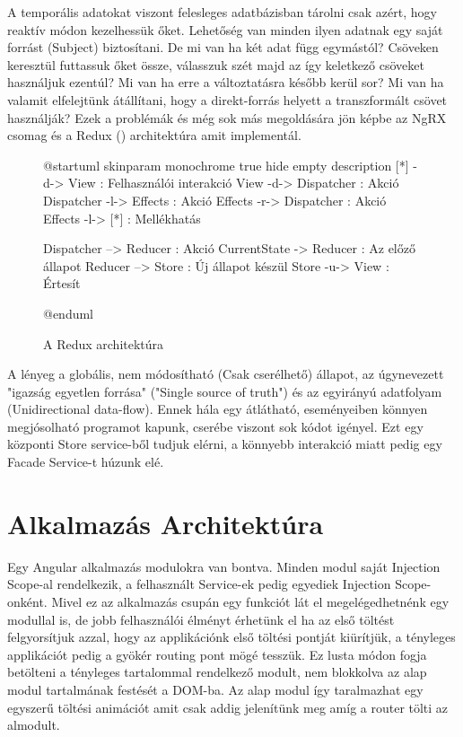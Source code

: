 A temporális adatokat viszont felesleges adatbázisban tárolni csak azért, hogy reaktív módon kezelhessük őket. Lehetőség van minden ilyen adatnak egy saját forrást (Subject) biztosítani. De mi van ha két adat függ egymástól? Csöveken keresztül futtassuk őket össze, válasszuk szét majd az így keletkező csöveket használjuk ezentúl? Mi van ha erre a változtatásra később kerül sor? Mi van ha valamit elfelejtünk átállítani, hogy a direkt-forrás helyett a transzformált csövet használják? Ezek a problémák és még sok más megoldására jön képbe az NgRX \cite{NgRx} csomag és a Redux (\cite{Redux}) architektúra amit implementál.

\begin{figure}[h!]
	\centering
	\begin{plantuml}
		@startuml
		skinparam monochrome true
		hide empty description
		[*] -d-> View : Felhasználói interakció
		View -d-> Dispatcher : Akció
		Dispatcher -l-> Effects : Akció
		Effects -r-> Dispatcher : Akció
		Effects -l-> [*] : Mellékhatás

		Dispatcher --> Reducer : Akció
		CurrentState -> Reducer : Az előző állapot
		Reducer --> Store : Új állapot készül
		Store -u-> View : Értesít

		@enduml
	\end{plantuml}
	\caption{A Redux architektúra}
	\label{fig:redux-architecture}
\end{figure}

A lényeg a globális, nem módosítható (Csak cserélhető) állapot, az úgynevezett "igazság egyetlen forrása" ("Single source of truth") és az egyirányú adatfolyam (Unidirectional data-flow). Ennek hála egy átlátható, eseményeiben könnyen megjósolható programot kapunk, cserébe viszont sok kódot igényel.
Ezt egy központi Store service-ből tudjuk elérni, a könnyebb interakció miatt pedig egy Facade\cite{Facade} Service-t húzunk elé.

\section{Alkalmazás Architektúra}

Egy Angular alkalmazás modulokra van bontva. Minden modul saját Injection Scope-al rendelkezik, a felhasznált Service-ek pedig egyediek Injection Scope-onként. Mivel ez az alkalmazás csupán egy funkciót lát el megelégedhetnénk egy modullal is, de jobb felhasználói élményt érhetünk el ha az első töltést felgyorsítjuk azzal, hogy az applikációnk első töltési pontját kiürítjük, a tényleges applikációt pedig a gyökér routing pont mögé tesszük. Ez lusta módon \cite{LazyLoad} fogja betölteni a tényleges tartalommal rendelkező modult, nem blokkolva az alap modul tartalmának festését a DOM-ba. Az alap modul így taralmazhat egy egyszerű töltési animációt amit csak addig jelenítünk meg amíg a router tölti az almodult.

